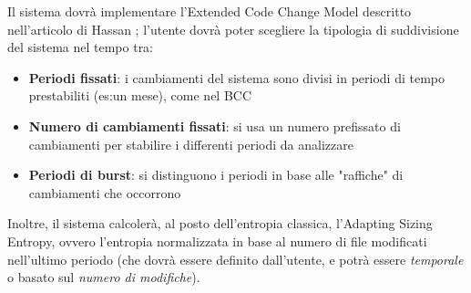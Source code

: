 Il sistema dovrà implementare l'Extended Code Change Model descritto nell'articolo di Hassan \cite{hassan2009predicting}; l'utente dovrà poter scegliere la tipologia di suddivisione del sistema nel tempo tra:
\begin{itemize}
\item \textbf{Periodi fissati}: i cambiamenti del sistema sono divisi in periodi di tempo prestabiliti (es:un mese), come nel BCC
\item \textbf{Numero di cambiamenti fissati}: si usa un numero prefissato di cambiamenti per stabilire i differenti periodi da analizzare
\item \textbf{Periodi di burst}: si distinguono i periodi in base alle "raffiche" di cambiamenti che occorrono
\end{itemize}
Inoltre, il sistema calcolerà, al posto dell'entropia classica, l'Adapting Sizing Entropy, ovvero l'entropia normalizzata in base al numero di file modificati nell'ultimo periodo (che dovrà essere definito dall'utente, e potrà essere \emph{temporale} o basato sul \emph{numero di modifiche}).